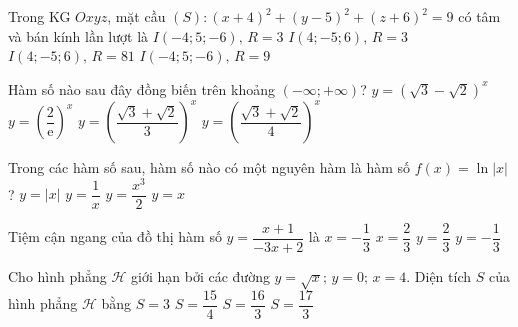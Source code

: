 \begin{ex}%
	Trong KG $Oxyz$, mặt cầu $(S)\colon(x+4)^2+(y-5)^2+(z+6)^2=9$ có tâm và bán kính lần lượt là
	\choice
	{\True $I(-4;5;-6),\,R=3$}
	{$I(4;-5;6),\,R=3$}
	{$I(4;-5;6),\,R=81$}
	{$I(-4;5;-6),\,R=9$}
\end{ex}

\begin{ex}%
	Hàm số nào sau đây đồng biến trên khoảng $(-\infty;+\infty)$?
	\choice
	{$y=\left(\sqrt{3}-\sqrt{2}\right)^x$}
	{$y=\left(\dfrac{2}{\text{e}}\right)^x$}
	{\True $y=\left(\dfrac{\sqrt{3}+\sqrt{2}}{3}\right)^x$}
	{$y=\left(\dfrac{\sqrt{3}+\sqrt{2}}{4}\right)^x$}
\end{ex}

\begin{ex}%
	Trong các hàm số sau, hàm số nào có một nguyên hàm là hàm số $f(x)=\ln \left|x\right|$?
	\choice
	{$y=\left|x\right|$}
	{\True $y=\dfrac{1}{x}$}
	{$y=\dfrac{x^{3}}{2}$}
	{$y=x$}
\end{ex}

\begin{ex}%
	Tiệm cận ngang của đồ thị hàm số $y=\dfrac{x+1}{-3x+2}$ là
	\choice
	{$x=-\dfrac{1}{3}$}
	{$x=\dfrac{2}{3}$}
	{$y=\dfrac{2}{3}$}
	{\True $y=-\dfrac{1}{3}$}
\end{ex}

\begin{ex}%
	Cho hình phẳng $\mathscr{H}$ giới hạn bởi các đường $y=\sqrt{x};\,y=0;\,x=4$. Diện tích $S$ của hình phẳng $\mathscr{H}$ bằng
	\choice
	{$S=3$}
	{$S=\dfrac{15}{4}$}
	{\True $S=\dfrac{16}{3}$}
	{$S=\dfrac{17}{3}$}
\end{ex}

